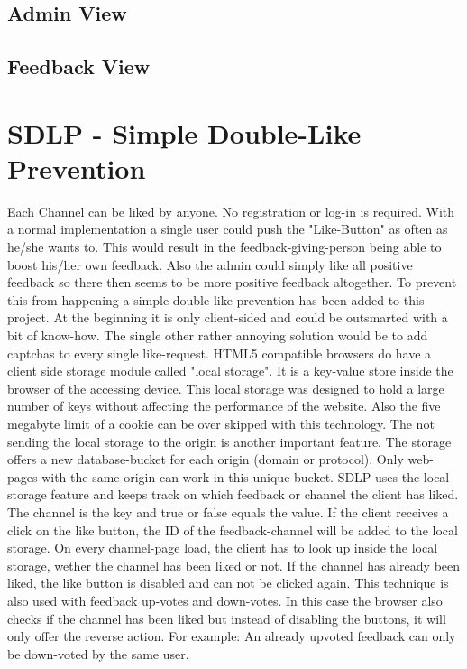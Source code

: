\subsection{Admin View}
\subsection{Feedback View}

\section{SDLP - Simple Double-Like Prevention}
Each Channel can be liked by anyone. No registration or log-in is required. With a normal implementation a single user could push the "Like-Button" as often as he/she wants to. This would result in the feedback-giving-person being able to  boost his/her own feedback. Also the admin could simply like all positive feedback so there then seems to be more positive feedback altogether. To prevent this from happening a simple double-like prevention has been added to this project. At the beginning it is only client-sided and could be outsmarted with a bit of know-how. The single other rather annoying solution would be to add captchas to every single like-request. 
HTML5 compatible browsers do have a client side storage module called "local storage". It is a key-value store inside the browser of the accessing device. This local storage was designed to hold a large number of keys without affecting the performance of the website. Also the five megabyte limit of a cookie can be  over skipped with  this technology. 
The not sending the local storage  to the origin is another important feature. 
The storage offers a new database-bucket for each origin (domain or protocol). Only web-pages with the same origin can work in this unique bucket. 
SDLP uses the local storage feature and keeps track on which feedback or channel the client has liked. The channel is the key and true or false equals the value. If the client receives a click on the like button, the ID of the feedback-channel will be added to the local storage. On every channel-page load, the client has to look up inside the local storage, wether the channel has been liked or not. If the channel has already been liked, the like button is disabled and can not be clicked again. 
This technique is also used with feedback up-votes and down-votes. In this case the browser also checks if the channel has been liked but instead of disabling the buttons, it will only offer the reverse action. 
For example: An already upvoted feedback can only be down-voted by the same user.

